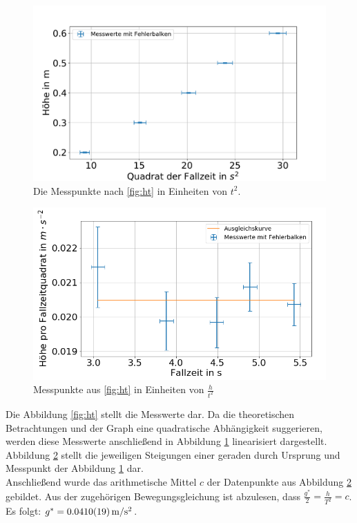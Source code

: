 \begin{figure}[h!]
	\centering
	\includegraphics[width=0.7\linewidth]{auswertung/Fallrad/h,t^2}
	\caption{Die Messpunkte nach \cref{fig:ht} in Einheiten von $t^2$. }
	\label{fig:ht2}
\end{figure}

\begin{figure}[h!]
	\centering
	\includegraphics[width=0.7\linewidth]{auswertung/Fallrad/T,ht^-2}
	\caption{Messpunkte aus \cref{fig:ht} in Einheiten von $\frac{h}{t^2}$}
	\label{fig:tht-2}
\end{figure}





Die Abbildung \ref{fig:ht} stellt die Messwerte dar. Da die theoretischen Betrachtungen und der Graph eine quadratische Abhängigkeit suggerieren, werden diese Messwerte anschließend in Abbildung \ref{fig:ht2} linearisiert dargestellt. Abbildung \ref{fig:tht-2} stellt die jeweiligen Steigungen einer geraden durch Ursprung und Messpunkt der Abbildung \ref{fig:ht2} dar. \\






Anschließend wurde das arithmetische Mittel $c$ der Datenpunkte aus Abbildung \ref{fig:tht-2} gebildet. Aus der zugehörigen Bewegungsgleichung ist abzulesen, dass $\frac{g^*}{2}=\frac{h}{T^2}=c$. Es folgt: $g^*=\SI{0.0410 \pm  0.0019}{m \per s \squared}$.





